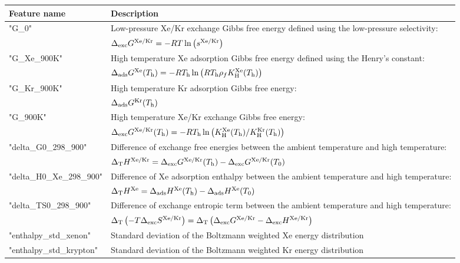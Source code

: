 \documentclass[main]{subfiles}
\begin{document}
\clearpage

  \begin{table}[ht]
  \centering
  \setlength{\extrarowheight}{1pt}
  \begin{tabular}{|l|m{10.3cm}|}
  \hline
   {Feature name} &  {Description} \\
  \hline
  "G\_0"  & Low-pressure Xe/Kr exchange Gibbs free energy defined using the low-pressure selectivity: \\
  & $\Delta_{\text{exc}} G^{\text{Xe/Kr}} = -RT\ln{\left(s\ensuremath{^{\text{Xe/Kr}}}\right)}$ \\
  \hline
  "G\_Xe\_900K"  & High temperature Xe adsorption Gibbs free energy defined using the Henry's constant: \\
  & $\Delta_{\text{ads}} G^{\text{Xe}} (T_{\text{h}}) = -RT_{\text{h}}\ln{\left(RT\ensuremath{_{\text{h}}}\rho_fK\ensuremath{_{\text{H}}}\ensuremath{^{\text{Xe}}}(T\ensuremath{_{\text{h}}})\right)}$ \\
  \hline
  "G\_Kr\_900K"  & High temperature Kr adsorption Gibbs free energy: \\
  & $\Delta_{\text{ads}} G^{\text{Kr}} (T_{\text{h}})$ \\
  \hline
  "G\_900K"  & High temperature Xe/Kr exchange Gibbs free energy: \\
    & $\Delta_{\text{exc}} G^{\text{Xe/Kr}} (T_{\text{h}}) = -RT_{\text{h}}\ln{\left(K\ensuremath{_{\text{H}}}\ensuremath{^{\text{Xe}}}(T\ensuremath{_{\text{h}}})/K\ensuremath{_{\text{H}}}\ensuremath{^{\text{Kr}}}(T\ensuremath{_{\text{h}}})\right)}$ \\
  \hline
  "delta\_G0\_298\_900"  & Difference of exchange free energies between the ambient temperature and high temperature: \\
  & $\Delta_{\text{T}} H^{\text{Xe/Kr}} = \Delta_{\text{exc}} G^{\text{Xe/Kr}} (T_{\text{h}})-\Delta_{\text{exc}} G^{\text{Xe/Kr}} (T_{\text{0}})$ \\
  \hline
  "delta\_H0\_Xe\_298\_900"  & Difference of Xe adsorption enthalpy between the ambient temperature and high temperature: \\
  & $\Delta_{\text{T}} H^{\text{Xe}} = \Delta_{\text{ads}} H^{\text{Xe}} (T_{\text{h}})-\Delta_{\text{ads}} H^{\text{Xe}} (T_{\text{0}})$ \\
  \hline
  "delta\_TS0\_298\_900"  & Difference of exchange entropic term between the ambient temperature and high temperature: \\
    & $\Delta_{\text{T}} \left(-T\Delta_{\text{exc}}S^{\text{Xe/Kr}}\right) = \Delta_{\text{T}} \left(\Delta_{\text{exc}}G^{\text{Xe/Kr}} - \Delta_{\text{exc}}H^{\text{Xe/Kr}}\right)$ \\
  \hline
  "enthalpy\_std\_xenon"  & Standard deviation of the Boltzmann weighted Xe energy distribution \\
  \hline
  "enthalpy\_std\_krypton"  & Standard deviation of the Boltzmann weighted Kr energy distribution \\

\end{tabular}
\end{table}
\end{document}
